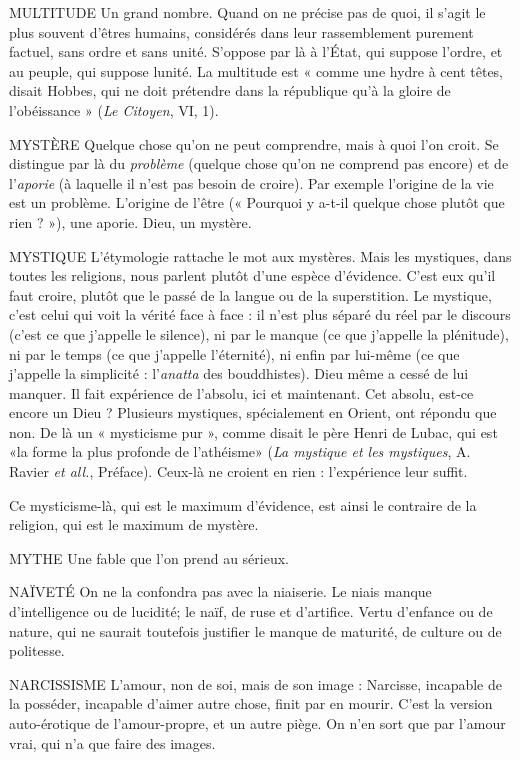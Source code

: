 MULTITUDE Un grand nombre. Quand on ne précise pas de quoi, il s’agit
le plus souvent d’êtres humains, considérés dans leur rassemblement
purement factuel, sans ordre et sans unité. S’oppose par là à l'État, qui
suppose l’ordre, et au peuple, qui suppose lunité. La multitude est « comme
une hydre à cent têtes, disait Hobbes, qui ne doit prétendre dans la république
qu’à la gloire de l’obéissance » ({\it Le Citoyen}, VI, 1).

MYSTÈRE Quelque chose qu’on ne peut comprendre, mais à quoi l’on
croit. Se distingue par là du {\it problème} (quelque chose qu’on ne
comprend pas encore) et de l’{\it aporie} (à laquelle il n’est pas besoin de croire). Par
exemple l’origine de la vie est un problème. L'origine de l’être (« Pourquoi y a-t-il
quelque chose plutôt que rien ? »), une aporie. Dieu, un mystère.

MYSTIQUE L’étymologie rattache le mot aux mystères. Mais les mystiques,
dans toutes les religions, nous parlent plutôt d’une espèce
d’évidence. C’est eux qu’il faut croire, plutôt que le passé de la langue ou de la
superstition. Le mystique, c’est celui qui voit la vérité face à face : il n’est plus
séparé du réel par le discours (c’est ce que j'appelle le silence), ni par le manque (ce
que j'appelle la plénitude), ni par le temps (ce que j'appelle l'éternité), ni enfin par
lui-même (ce que j'appelle la simplicité : l’{\it anatta} des bouddhistes). Dieu même a
cessé de lui manquer. Il fait expérience de l'absolu, ici et maintenant. Cet absolu,
est-ce encore un Dieu ? Plusieurs mystiques, spécialement en Orient, ont répondu
que non. De là un « mysticisme pur », comme disait le père Henri de Lubac, qui
est «la forme la plus profonde de l’athéisme» ({\it La mystique et les mystiques},
A. Ravier {\it et all.}, Préface). Ceux-là ne croient en rien : l'expérience leur suffit.

Ce mysticisme-là, qui est le maximum d’évidence, est ainsi le contraire de
la religion, qui est le maximum de mystère.

MYTHE Une fable que l’on prend au sérieux.



NAÏVETÉ On ne la confondra pas avec la niaiserie. Le niais manque d’intelligence
ou de lucidité; le naïf, de ruse et d'artifice. Vertu
d’enfance ou de nature, qui ne saurait toutefois justifier le manque de maturité,
de culture ou de politesse.

NARCISSISME  L’amour, non de soi, mais de son image : Narcisse, incapable
de la posséder, incapable d’aimer autre chose, finit
par en mourir. C’est la version auto-érotique de l’amour-propre, et un autre
piège. On n’en sort que par l'amour vrai, qui n’a que faire des images.

